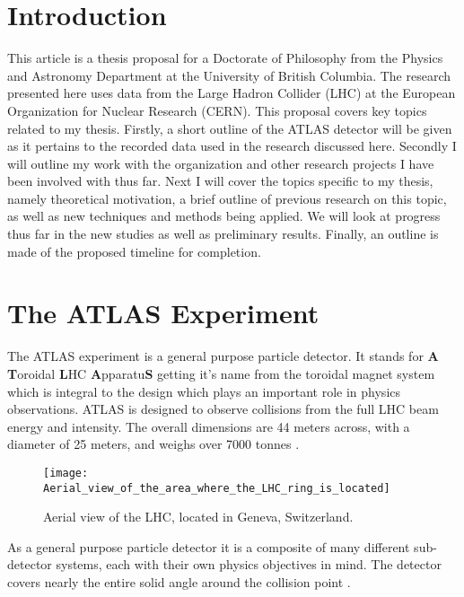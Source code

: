 \documentclass[12pt]{article}
\begin{document}

\newpage
\section{Introduction}
This article is a thesis proposal for a Doctorate of Philosophy from the Physics
and Astronomy Department at the University of British Columbia. The research
presented here uses data from the Large Hadron Collider (LHC) at the European
Organization for Nuclear Research (CERN). This proposal covers key topics
related to my thesis. Firstly, a short outline of the ATLAS detector will be
given as it pertains to the recorded data used in the research discussed here.
Secondly I will outline my work with the organization and other research
projects I have been involved with thus far. Next I will cover the topics
specific to my thesis, namely theoretical motivation, a brief outline of
previous research on this topic, as well as new techniques and methods being
applied. We will look at progress thus far in the new studies as well
as preliminary results. Finally, an outline is made of the proposed timeline for
completion.

\section{The ATLAS Experiment}
The ATLAS experiment is a general purpose particle detector. It stands for
\textbf{A} \textbf{T}oroidal \textbf{L}HC \textbf{A}pparatu\textbf{S} getting
it's name from the toroidal magnet system which is integral to the design which
plays an important role in physics observations. ATLAS is designed to observe
collisions from the full LHC beam energy and intensity. The overall dimensions
are 44 meters across, with a diameter of 25 meters, and weighs over 7000 tonnes
\cite{Aad_2024}. \begin{wrapfigure}{l}{0.42\textwidth}
    \centering
    \texttt{[image: Aerial\_view\_of\_the\_area\_where\_the\_LHC\_ring\_is\_located]}
    \caption{Aerial view of the LHC, located in Geneva, Switzerland.}
    \label{fig:aerial_view}
\end{wrapfigure} As a general purpose particle detector it is a composite of
many different sub-detector systems, each with their own physics objectives in
mind. The detector covers nearly the entire solid angle around the
collision point \cite{The_ATLAS_Collaboration_2008}. 
\end{document}
